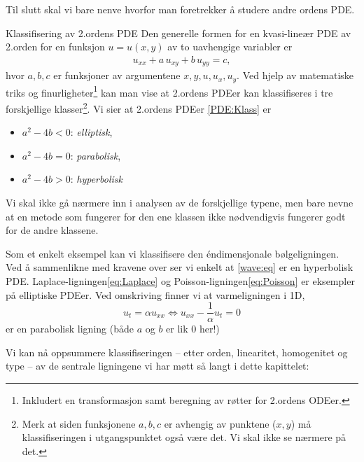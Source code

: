 Til slutt skal vi bare nenve hvorfor man foretrekker å studere andre ordens PDE. 

\begin{oppsum}{Klassifisering av 2.ordens PDE}\label{oppsum:klassifisering}
Den generelle formen for en kvasi-lineær PDE av 2.orden for en funksjon \( u = u(x, y) \) av to uavhengige variabler er
\begin{align}\label{PDE:Klass}
u_{xx} + a\, u_{xy} + b\, u_{yy} = c,
\end{align}
hvor \(a, b, c\) er funksjoner av argumentene \( x, y, u, u_x, u_y \).
Ved hjelp av matematiske triks og finurligheter\footnote{Inkludert en transformasjon samt beregning av røtter for 2.ordens ODEer.} kan man vise at 2.ordens PDEer kan klassifiseres i tre forskjellige klasser\footnote{Merk at siden funksjonene $a,b,c$ er avhengig av punktene ($x,y$) må klassifiseringen i utgangspunktet også være det. Vi skal ikke se nærmere på det.}. Vi sier at 2.ordens PDEer \eqref{PDE:Klass} er 
\begin{itemize}
\item $a^2-4b<0$:  \emph{elliptisk},
\item $a^2-4b=0$:  \emph{parabolisk},
\item $a^2-4b>0$:  \emph{hyperbolisk}
\end{itemize}
Vi skal ikke gå nærmere inn i analysen av de forskjellige typene, men bare nevne at en metode som fungerer for den ene klassen ikke nødvendigvis fungerer godt for de andre klassene. 

Som et enkelt eksempel kan vi klassifisere den éndimensjonale bølgeligningen. Ved å sammenlikne med kravene over ser vi enkelt at \eqref{wave:eq} er en hyperbolisk PDE. Laplace-ligningen\eqref{eq:Laplace} og Poisson-ligningen\eqref{eq:Poisson} er eksempler på elliptiske PDEer. Ved omskriving finner vi at varmeligningen i 1D,
\[u_t= \alpha u_{xx} \Leftrightarrow u_{xx} - \frac{1}{\alpha} u_t = 0\]
er en parabolisk ligning (både $a$ og $b$ er lik $0$ her!)
\end{oppsum}

Vi kan nå oppsummere klassifiseringen -- etter orden, linearitet, homogenitet og type -- av de sentrale ligningene vi har møtt så langt i dette kapittelet:

